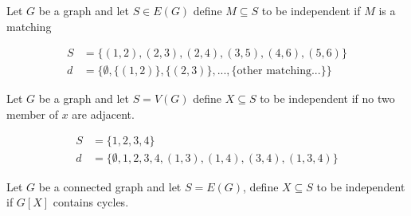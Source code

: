 			\begin{example}
				Let $G$ be a graph and let $S \in E(G)$ define $M\subseteq S$ to be independent if $M$ is a matching
			\end{example}

			\begin{figure}
				\centering
			\end{figure}

			\begin{align}
				S &= \{(1, 2), (2, 3), (2, 4), (3, 5), (4, 6), (5, 6)\} \\
				d &= \{\emptyset, \{(1, 2)\}, \{(2, 3)\}, ... , \{\text{other matching...}\}\}
			\end{align}

			\begin{example}
				Let $G$ be a graph and let $S = V(G)$ define $X \subseteq S$ to be independent if no two member of $x$ are adjacent.
			\end{example}

			\begin{figure}
				\centering
			\end{figure}

			\begin{align}
				S &= \{1, 2, 3, 4\} \\
				d &= \{\emptyset, 1, 2, 3, 4, (1, 3), (1, 4), (3, 4), (1, 3, 4)\}
			\end{align}

			\begin{example}
				Let $G$ be a connected graph and let $S = E(G)$, define $X \subseteq S$ to be independent if $G[X]$ contains cycles.
			\end{example}

